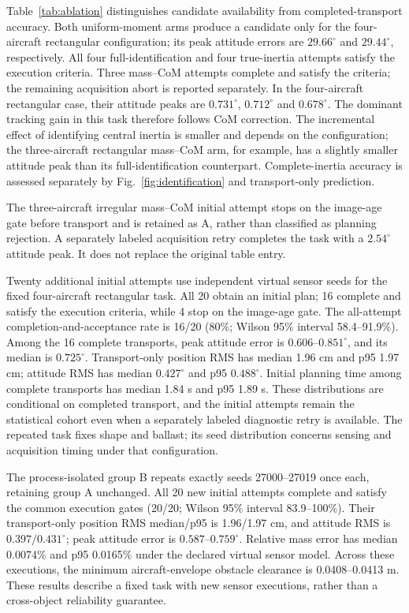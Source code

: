 Table~\ref{tab:ablation} distinguishes candidate availability from completed-transport accuracy. Both uniform-moment arms produce a candidate only for the four-aircraft rectangular configuration; its peak attitude errors are $29.66^\circ$ and $29.44^\circ$, respectively. All four full-identification and four true-inertia attempts satisfy the execution criteria. Three mass--CoM attempts complete and satisfy the criteria; the remaining acquisition abort is reported separately. In the four-aircraft rectangular case, their attitude peaks are $0.731^\circ$, $0.712^\circ$ and $0.678^\circ$. The dominant tracking gain in this task therefore follows CoM correction. The incremental effect of identifying central inertia is smaller and depends on the configuration; the three-aircraft rectangular mass--CoM arm, for example, has a slightly smaller attitude peak than its full-identification counterpart. Complete-inertia accuracy is assessed separately by Fig.~\ref{fig:identification} and transport-only prediction.

The three-aircraft irregular mass--CoM initial attempt stops on the image-age gate before transport and is retained as A, rather than classified as planning rejection. A separately labeled acquisition retry completes the task with a $2.54^\circ$ attitude peak. It does not replace the original table entry.

Twenty additional initial attempts use independent virtual sensor seeds for the fixed four-aircraft rectangular task. All 20 obtain an initial plan; 16 complete and satisfy the execution criteria, while 4 stop on the image-age gate. The all-attempt completion-and-acceptance rate is 16/20 (80\%; Wilson 95\% interval 58.4--91.9\%). Among the 16 complete transports, peak attitude error is $0.606$--$0.851^\circ$, and its median is $0.725^\circ$. Transport-only position RMS has median 1.96 cm and p95 1.97 cm; attitude RMS has median $0.427^\circ$ and p95 $0.488^\circ$. Initial planning time among complete transports has median 1.84 s and p95 1.89 s. These distributions are conditional on completed transport, and the initial attempts remain the statistical cohort even when a separately labeled diagnostic retry is available. The repeated task fixes shape and ballast; its seed distribution concerns sensing and acquisition timing under that configuration.


The process-isolated group B repeats exactly seeds 27000--27019 once each, retaining group A unchanged. All 20 new initial attempts complete and satisfy the common execution gates (20/20; Wilson 95\% interval 83.9--100\%). Their transport-only position RMS median/p95 is 1.96/1.97 cm, and attitude RMS is $0.397/0.431^\circ$; peak attitude error is $0.587$--$0.759^\circ$. Relative mass error has median 0.0074\% and p95 0.0165\% under the declared virtual sensor model. Across these executions, the minimum aircraft-envelope obstacle clearance is 0.0408--0.0413 m. These results describe a fixed task with new sensor executions, rather than a cross-object reliability guarantee.

